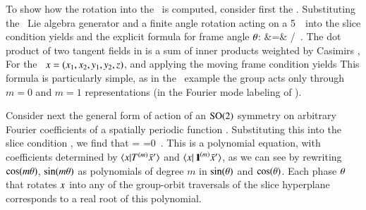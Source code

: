 \documentclass[preprint,12pt]{elsarticle} %
\begin{document}
To show how the rotation into the \slice\ is computed, consider first the
\cLe. Substituting the \ Lie algebra
generator and a finite angle  rotation  acting on a
5\dmn\ \statesp\ into the slice condition 
yields
and the explicit formula for frame angle ${\bf \theta}$:
\bea
\tan\gSpace &=&
   {\braket{\ssp}{\sliceTan{}}}/
          {\braket{\groupTan_{}(\ssp)}{\sliceTan{}}}
\,.
\label{SL:CLEsliceRot}
\eea
The dot product of two tangent fields in  is a
sum of inner products weighted by Casimirs ,
For the \cLe\
$x = (x_1,x_2,y_1,y_2,z)$,
and applying the moving frame condition  yields
This formula is particularly simple, as in the \cLe\
example the group acts only through $m=0$ and $m=1$ representations
(in the Fourier mode labeling of ).

Consider next the general form  of action of an
$\textrm{SO}(2)$ symmetry on arbitrary Fourier coefficients of a spatially
periodic function \refeq{FourierExp}. Substituting this into the slice
condition \refeq{PCsectQ}
, we find that
\bea
\braket{e^{-\gSpace \Lg}\ssp}{\groupTan(\slicep)}
=
\continue
\edit{=\sum\limits_m
   \left(
    \braket{\ssp}{\Lg^{(m)} \slicep} \cos(m\gSpace)
  - m\braket{\ssp}{\id^{(m)} \slicep} \sin(m\gSpace)
   \right)}
   =0
\,.
\label{eq:so2sing}
\eea
This is a polynomial equation, with coefficients determined by
$\braket{\ssp}{\Lg^{(m)} \slicep}$ and $\braket{\ssp}{\id^{(m)}\slicep}$,
as we can see by rewriting $\cos(m{\bf \theta})$, $\sin(m{\bf \theta})$ as
polynomials of degree $m$ in $\sin({\bf \theta})$ and $\cos({\bf \theta})$. Each
phase ${\bf \theta}$ that rotates $x$ into any of the group-orbit
traversals of the slice hyperplane corresponds to a real root of this
polynomial.
\end{document}
